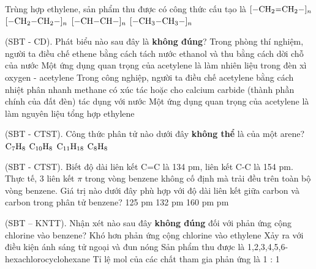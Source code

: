 \documentclass[12pt,a4paper]{article}
\begin{document}
\begin{ex}
Trùng hợp ethylene, sản phẩm thu được có công thức cấu tạo là
\choice
{$\ce{[-CH2=CH2-]_n}$}
{\True $\ce{[-CH2-CH2-]_n}$}
{$\ce{[-CH-CH-]_n}$}
{$\ce{[-CH3-CH3-]_n}$}
\end{ex}

\begin{ex}
(SBT - CD). Phát biểu nào sau đây là \textbf{không đúng}?
\choice
{Trong phòng thí nghiệm, người ta điều chế ethene bằng cách tách nước ethanol và thu bằng cách dời chỗ của nước}
{Một ứng dụng quan trọng của acetylene là làm nhiên liệu trong đèn xì oxygen - acetylene}
{\True Trong công nghiệp, người ta điều chế acetylene bằng cách nhiệt phân nhanh methane có xúc tác hoặc cho calcium carbide (thành phần chính của đất đèn) tác dụng với nước}
{Một ứng dụng quan trọng của acetylene là làm nguyên liệu tổng hợp ethylene}
\end{ex}

\begin{ex}
(SBT - CTST). Công thức phân tử nào dưới đây \textbf{không thể} là của một arene?
\choice
{$\ce{C7H8}$}
{$\ce{C10H8}$}
{\True $\ce{C11H18}$}
{$\ce{C8H8}$}
\end{ex}

\begin{ex}
(SBT - CTST). Biết độ dài liên kết C=C là 134 pm, liên kết C-C là 154 pm. Thực tế, 3 liên kết $\pi$ trong vòng benzene không cố định mà trải đều trên toàn bộ vòng benzene. Giá trị nào dưới đây phù hợp với độ dài liên kết giữa carbon và carbon trong phân tử benzene?
\choice
{125 pm}
{132 pm}
{160 pm}
{ pm}
\end{ex}

\begin{ex}
(SBT – KNTT). Nhận xét nào sau đây \textbf{không đúng} đối với phản ứng cộng chlorine vào benzene?
\choice
{Khó hơn phản ứng cộng chlorine vào ethylene}
{Xảy ra với điều kiện ánh sáng tử ngoại và đun nóng}
{Sản phẩm thu được là 1,2,3,4,5,6-hexachlorocyclohexane}
{\True Tỉ lệ mol của các chất tham gia phản ứng là 1 : 1}
\end{ex}
\end{document}
